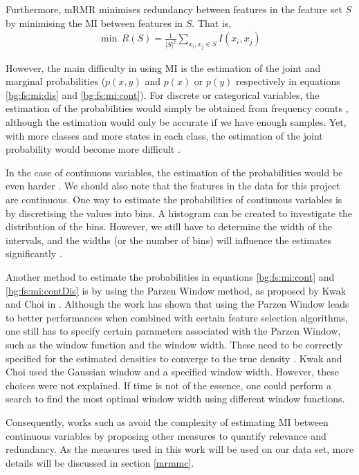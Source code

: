 \documentclass[12pt, twoside, a4paper]{article}
\begin{document}
Furthermore, mRMR minimises redundancy between features in the feature set $S$ by minimising the MI between features in $S$. That is,
\begin{align*}
\min \, R(S) = \frac{1}{|S|^2} \sum_{x_i, x_j \in S} I(x_i, x_j)
\end{align*}

However, the main difficulty in using MI is the estimation of the joint and marginal probabilities ($p(x, y)$ and $p(x)$ or $p(y)$ respectively in equations \ref{bg:fs:mi:dis} and \ref{bg:fs:mi:cont}). For discrete or categorical variables, the estimation of the probabilities would simply be obtained from frequency counts \cite{RefWorks:183}, although the estimation would only be accurate if we have enough samples. Yet, with more classes and more states in each class, the estimation of the joint probability would become more difficult \cite{RefWorks:140}.

In the case of continuous variables, the estimation of the probabilities would be even harder \cite{RefWorks:185}. We should also note that the features in the data for this project are continuous. One way to estimate the probabilities of continuous variables is by discretising the values into bins. A histogram can be created to investigate the distribution of the bins. However, we still have to determine the width of the intervals, and the widths (or the number of bins) will influence the estimates significantly \cite{RefWorks:186}.

Another method to estimate the probabilities in equations \ref{bg:fs:mi:cont} and \ref{bg:fs:mi:contDis} is by using the Parzen Window method, as proposed by Kwak and Choi in \cite{RefWorks:183}. Although the work has shown that using the Parzen Window leads to better performances when combined with certain feature selection algorithms, one still has to specify certain parameters associated with the Parzen Window, such as the window function and the window width. These need to be correctly specified for the estimated densities to converge to the true density \cite{RefWorks:184}. Kwak and Choi used the Gaussian window and a specified window width. However, these choices were not explained. If time is not of the essence, one could perform a search to find the most optimal window width using different window functions.

Consequently, works such as \cite{RefWorks:187} avoid the complexity of estimating MI between continuous variables by proposing other measures to quantify relevance and redundancy. As the measures used in this work will be used on our data set, more details will be discussed in section \ref{mrmmc}.
\end{document}
